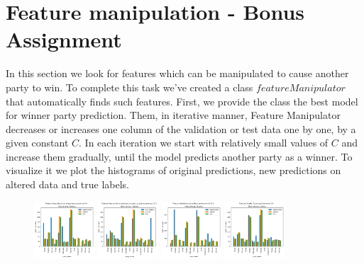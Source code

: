 \documentclass[12pt]{article}
\begin{document}
\section{Feature manipulation - Bonus Assignment}
In this section we look for features which can be manipulated to cause another party to win. To complete this task we've created a class $featureManipulator$ that automatically finds such features. First, we provide the class the best model for winner party prediction. Them, in iterative manner, Feature Manipulator decreases or increases one column of the validation or test data one by one, by a given constant $C$. In each iteration we start with relatively small values of $C$ and increase them gradually, until the model predicts another party as a winner. To visualize it we plot the histograms of original predictions, new predictions on altered data and true labels.   

\begin{figure}[ht]
	\centering
	\includegraphics[width=0.2\textwidth]{dramatic_feature/Avg_education_importance_increased}
	\includegraphics[width=0.2\textwidth]{dramatic_feature/Avg_monthly_expense_on_pets_or_plants_increased}
	\includegraphics[width=0.2\textwidth]{dramatic_feature/Weighted_education_rank_increased}	
	\includegraphics[width=0.2\textwidth]{dramatic_feature/Yearly_ExpensesK_increased}					
\end{figure}
\end{document}
